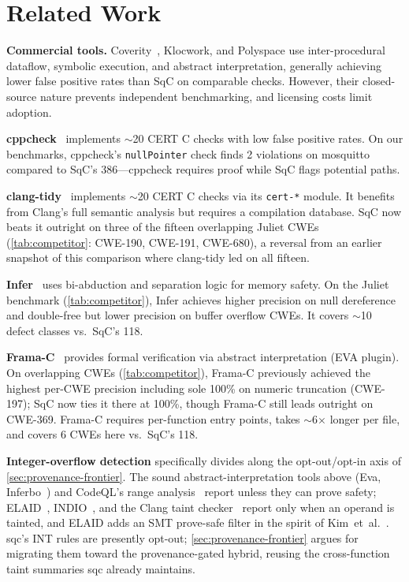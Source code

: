 \section{Related Work}
\label{sec:related}

\textbf{Commercial tools.}
Coverity~\cite{coverity}, Klocwork, and Polyspace use inter-procedural
dataflow, symbolic execution, and abstract interpretation, generally
achieving lower false positive rates than SqC on comparable checks.
However, their closed-source nature prevents independent benchmarking,
and licensing costs limit adoption.

\textbf{cppcheck}~\cite{cppcheck} implements $\sim$20 CERT C checks
with low false positive rates.  On our benchmarks, cppcheck's
\texttt{nullPointer} check finds 2 violations on mosquitto compared
to SqC's 386---cppcheck requires proof while SqC flags potential
paths.

\textbf{clang-tidy}~\cite{clang-tidy} implements $\sim$20 CERT C
checks via its \texttt{cert-*} module.  It benefits from Clang's full
semantic analysis but requires a compilation database.  SqC now beats
it outright on three of the fifteen overlapping Juliet CWEs
(\cref{tab:competitor}: CWE-190, CWE-191, CWE-680), a reversal from an
earlier snapshot of this comparison where clang-tidy led on all
fifteen.

\textbf{Infer}~\cite{infer} uses bi-abduction and separation logic
for memory safety.  On the Juliet benchmark (\cref{tab:competitor}),
Infer achieves higher precision on null dereference and double-free
but lower precision on buffer overflow CWEs.  It covers $\sim$10
defect classes vs.\ SqC's 118.

\textbf{Frama-C}~\cite{frama-c} provides formal verification via
abstract interpretation (EVA plugin).  On overlapping CWEs
(\cref{tab:competitor}), Frama-C previously achieved the highest
per-CWE precision including sole 100\% on numeric truncation
(CWE-197); SqC now ties it there at 100\%, though Frama-C still leads
outright on CWE-369.  Frama-C requires per-function entry points,
takes $\sim$6$\times$ longer per file, and covers 6 CWEs here vs.\
SqC's 118.

\textbf{Integer-overflow detection} specifically divides along the
opt-out/opt-in axis of \cref{sec:provenance-frontier}.  The sound
abstract-interpretation tools above (Eva, Inferbo~\cite{inferbo}) and
CodeQL's range analysis~\cite{codeql-range} report unless they can
prove safety; ELAID~\cite{elaid}, INDIO~\cite{indio}, and the Clang
taint checker~\cite{clang-taint} report only when an operand is
tainted, and ELAID adds an SMT prove-safe filter in the spirit of
Kim~et~al.~\cite{kim-filter}.  sqc's INT rules are presently opt-out;
\cref{sec:provenance-frontier} argues for migrating them toward the
provenance-gated hybrid, reusing the cross-function taint summaries
sqc already maintains.

